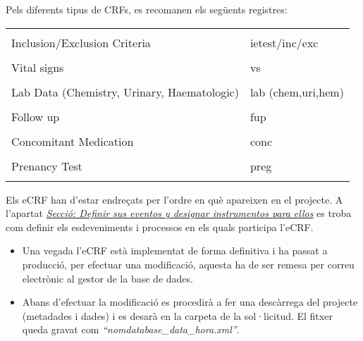 \documentclass[
]{article}
\providecommand{\tightlist}{%
  \setlength{\itemsep}{0pt}\setlength{\parskip}{0pt}}
\begin{document}
Pels diferents tipus de CRFs, es recomanen els següents registres:

\begin{table}[!h]
\centering\begingroup\fontsize{13}{15}\selectfont

\begin{tabular}{l|l}
\hline
\cellcolor[HTML]{993489}{\textcolor{white}{Nom del formulari}} & \cellcolor[HTML]{993489}{\textcolor{white}{Prefix}}\\
\hline
\cellcolor{gray!6}{Screening} & \cellcolor{gray!6}{scr}\\
\hline
Inclusion/Exclusion Criteria & ietest/inc/exc\\
\hline
\cellcolor{gray!6}{Demographic data} & \cellcolor{gray!6}{dm}\\
\hline
Vital signs & vs\\
\hline
\cellcolor{gray!6}{Medical History} & \cellcolor{gray!6}{mh}\\
\hline
Lab Data (Chemistry, Urinary, Haematologic) & lab (chem,uri,hem)\\
\hline
\cellcolor{gray!6}{Treatment Data} & \cellcolor{gray!6}{tto}\\
\hline
Follow up & fup\\
\hline
\cellcolor{gray!6}{Adverse Events} & \cellcolor{gray!6}{aes}\\
\hline
Concomitant Medication & conc\\
\hline
\cellcolor{gray!6}{ECG} & \cellcolor{gray!6}{ecg}\\
\hline
Prenancy Test & preg\\
\hline
\cellcolor{gray!6}{Discontinuation Study} & \cellcolor{gray!6}{discont}\\
\hline
\end{tabular}
\endgroup{}
\end{table}

Els eCRF han d'estar endreçats per l'ordre en què apareixen en el projecte. A l'apartat \protect\hyperlink{en1}{\emph{Secció: Definir sus eventos y designar instrumentos para ellos}} es troba com definir els esdeveniments i processos en els quals participa l'eCRF.

\begin{itemize}
\tightlist
\item
  Una vegada l'eCRF està implementat de forma definitiva i ha passat a producció, per efectuar una modificació, aquesta ha de ser remesa per correu electrònic al gestor de la base de dades.
\item
  Abans d'efectuar la modificació es procedirà a fer una descàrrega del projecte (metadades i dades) i es desarà en la carpeta de la sol·licitud. El fitxer queda gravat com \emph{``nomdatabase\_data\_hora.xml''}.
\end{itemize}
\end{document}

